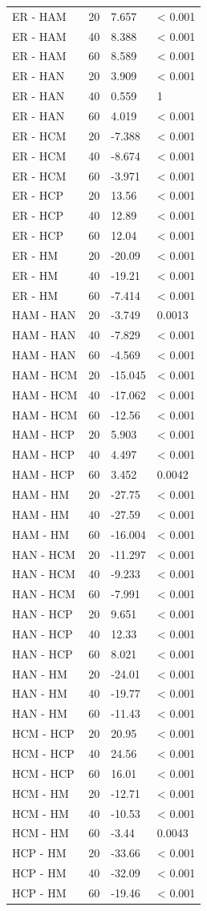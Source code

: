 \begin{longtable}[]{@{}llll@{}}
ER - HAM & 20 & 7.657 & \textless{} 0.001\tabularnewline
ER - HAM & 40 & 8.388 & \textless{} 0.001\tabularnewline
ER - HAM & 60 & 8.589 & \textless{} 0.001\tabularnewline
ER - HAN & 20 & 3.909 & \textless{} 0.001\tabularnewline
ER - HAN & 40 & 0.559 & 1\tabularnewline
ER - HAN & 60 & 4.019 & \textless{} 0.001\tabularnewline
ER - HCM & 20 & -7.388 & \textless{} 0.001\tabularnewline
ER - HCM & 40 & -8.674 & \textless{} 0.001\tabularnewline
ER - HCM & 60 & -3.971 & \textless{} 0.001\tabularnewline
ER - HCP & 20 & 13.56 & \textless{} 0.001\tabularnewline
ER - HCP & 40 & 12.89 & \textless{} 0.001\tabularnewline
ER - HCP & 60 & 12.04 & \textless{} 0.001\tabularnewline
ER - HM & 20 & -20.09 & \textless{} 0.001\tabularnewline
ER - HM & 40 & -19.21 & \textless{} 0.001\tabularnewline
ER - HM & 60 & -7.414 & \textless{} 0.001\tabularnewline
HAM - HAN & 20 & -3.749 & 0.0013\tabularnewline
HAM - HAN & 40 & -7.829 & \textless{} 0.001\tabularnewline
HAM - HAN & 60 & -4.569 & \textless{} 0.001\tabularnewline
HAM - HCM & 20 & -15.045 & \textless{} 0.001\tabularnewline
HAM - HCM & 40 & -17.062 & \textless{} 0.001\tabularnewline
HAM - HCM & 60 & -12.56 & \textless{} 0.001\tabularnewline
HAM - HCP & 20 & 5.903 & \textless{} 0.001\tabularnewline
HAM - HCP & 40 & 4.497 & \textless{} 0.001\tabularnewline
HAM - HCP & 60 & 3.452 & 0.0042\tabularnewline
HAM - HM & 20 & -27.75 & \textless{} 0.001\tabularnewline
HAM - HM & 40 & -27.59 & \textless{} 0.001\tabularnewline
HAM - HM & 60 & -16.004 & \textless{} 0.001\tabularnewline
HAN - HCM & 20 & -11.297 & \textless{} 0.001\tabularnewline
HAN - HCM & 40 & -9.233 & \textless{} 0.001\tabularnewline
HAN - HCM & 60 & -7.991 & \textless{} 0.001\tabularnewline
HAN - HCP & 20 & 9.651 & \textless{} 0.001\tabularnewline
HAN - HCP & 40 & 12.33 & \textless{} 0.001\tabularnewline
HAN - HCP & 60 & 8.021 & \textless{} 0.001\tabularnewline
HAN - HM & 20 & -24.01 & \textless{} 0.001\tabularnewline
HAN - HM & 40 & -19.77 & \textless{} 0.001\tabularnewline
HAN - HM & 60 & -11.43 & \textless{} 0.001\tabularnewline
HCM - HCP & 20 & 20.95 & \textless{} 0.001\tabularnewline
HCM - HCP & 40 & 24.56 & \textless{} 0.001\tabularnewline
HCM - HCP & 60 & 16.01 & \textless{} 0.001\tabularnewline
HCM - HM & 20 & -12.71 & \textless{} 0.001\tabularnewline
HCM - HM & 40 & -10.53 & \textless{} 0.001\tabularnewline
HCM - HM & 60 & -3.44 & 0.0043\tabularnewline
HCP - HM & 20 & -33.66 & \textless{} 0.001\tabularnewline
HCP - HM & 40 & -32.09 & \textless{} 0.001\tabularnewline
HCP - HM & 60 & -19.46 & \textless{} 0.001\tabularnewline
\bottomrule

\end{longtable}

